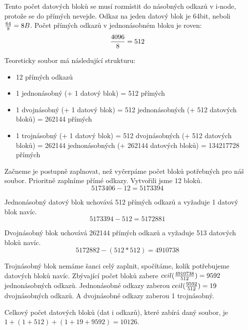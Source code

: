 Tento počet datových bloků se musí rozmístit do násobných odkazů v i-node, protože se do přímých nevejde. Odkaz na jeden datový blok je 64bit, neboli ${64 \over 8} = 8B$. Počet přímých odkazů v jednonásobném bloku je roven:
$${4096 \over 8} = 512$$

Teoreticky soubor má následující strukturu:
\begin{itemize}
    \item 12 přímých odkazů
    \item 1 jednonásobný (+ 1 datový blok) = 512 přímých
    \item 1 dvojnásobný (+ 1 datový blok) = 512 jednonásobných (+ 512 datových bloků) = 262144 přímých
    \item 1 trojnásobný (+ 1 datový blok) = 512 dvojnásobných (+ 512 datových bloků) = 262144 jednonásobných (+ 262144 datových bloků) = 134217728 přímých
\end{itemize}

Začneme je postupně zaplnovat, než vyčerpáme počet bloků potřebných pro náš soubor. Prioritně zaplníme přímé odkazy. Vytvořili jsme 12 bloků.
$$5173406 - 12 = 5173394$$

Jednonásobný datový blok uchovává 512 přímých odkazů a vyžaduje 1 datový blok navíc.
$$5173394 - 512 = 5172881$$

Dvojnásobný blok uchovává 262144 přímých odkazů a vyžaduje 513 datových bloků navíc.
$$5172882 - (512 * 512) = 4910738$$

Trojnásobný blok nemáme šanci celý zaplnit, spočítáme, kolik potřebujeme datových bloků navíc.
Zbývající počet bloků zabere $ceil({4910738 \over 512}) = 9592$ jednonásobných odkazů. Jednonásobné odkazy zaberou $ceil({9592 \over 512}) = 19$ dvojnásobných odkazů. A dvojnásobné odkazy zaberou 1 trojnásobný.

Celkový počet datových bloků (dat i odkazů), které zabírá daný soubor, je $1 + (1 + 512) + (1 + 19 + 9592) = 10126$.